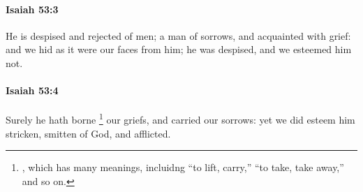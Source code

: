 		\paragraph{Isaiah 53:3} %
			\label{ISAIAH-53-3}

			He is despised and rejected of men; a man of sorrows, and acquainted with grief: and we hid as it were our faces from him; he was despised, and we esteemed him not.


		\paragraph{Isaiah 53:4} %
			\label{ISAIAH-53-4}

			Surely he hath borne%
				\footnote{%
					, which has many meanings, incluidng ``to lift, carry,'' ``to take, take away,'' and so on.
					}
			our griefs, and carried our sorrows: yet we did esteem him stricken, smitten of God, and afflicted.

